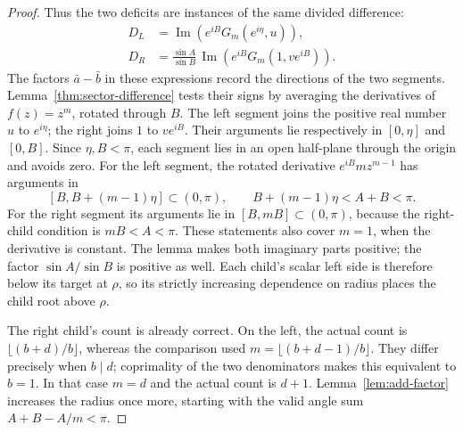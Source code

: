 \documentclass[10pt,a4paper]{amsart}
\begin{document}
\begin{proof}
Thus the two deficits are instances of the same divided difference:
\begin{equation}\label{eq:mediant-differences}
 \begin{split}
 D_L&=\operatorname{Im}\!\left(e^{iB}G_m(e^{i\eta},u)\right),\\
 D_R&=\frac{\sin A}{\sin B}\,
       \operatorname{Im}\!\left(e^{iB}G_m(1,ve^{iB})\right).
 \end{split}
\end{equation}
The factors $\bar a-\bar b$ in these expressions record the directions
of the two segments. Lemma~\ref{thm:sector-difference} tests their signs
by averaging the derivatives of $f(z)=z^m$, rotated through $B$.
The left segment joins the positive real number $u$ to $e^{i\eta}$;
the right joins $1$ to $ve^{iB}$.  Their arguments lie respectively in
$[0,\eta]$ and $[0,B]$.  Since $\eta,B<\pi$, each segment lies in an open
half-plane through the origin and avoids zero.
For the left segment, the rotated derivative $e^{iB}mz^{m-1}$ has arguments in
\[
 [B,B+(m-1)\eta]\subset(0,\pi),
 \qquad B+(m-1)\eta<A+B<\pi.
\]
For the right segment its arguments lie in $[B,mB]\subset(0,\pi)$,
because the right-child condition is $mB<A<\pi$.
These statements also cover $m=1$, when the derivative is constant.
The lemma makes both imaginary parts positive; the factor $\sin A/\sin B$
is positive as well.  Each child's scalar left side is therefore below its
target at $\rho$, so its strictly increasing dependence on radius places
the child root above $\rho$.

The right child's count is already correct.  On the left, the actual count
is $\lfloor(b+d)/b\rfloor$, whereas the comparison used
$m=\lfloor(b+d-1)/b\rfloor$.
They differ precisely when $b\mid d$; coprimality of the two denominators
makes this equivalent to $b=1$.
In that case $m=d$ and the actual count is $d+1$.
Lemma~\ref{lem:add-factor} increases the radius once more, starting with
the valid angle sum $A+B-A/m<\pi$.
\end{proof}
\end{document}
